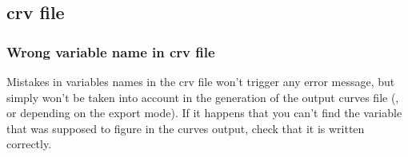 \documentclass[a4paper, 12pt]{report}
\begin{document}
\subsection{crv file}

\subsubsection{Wrong variable name in crv file}

Mistakes in variables names in the crv file won't trigger any error message, but simply won't be taken into account in the generation of the output curves file (,  or  depending on the export mode). If it happens that you can't find the variable that was supposed to figure in the curves output, check that it is written correctly.
\end{document}
